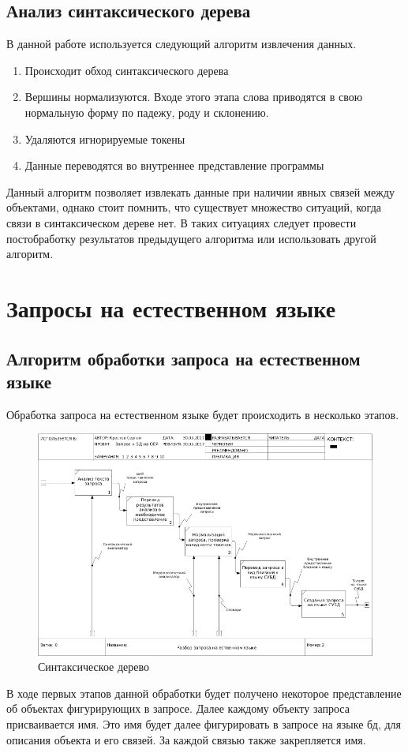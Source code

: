 \subsection{Анализ синтаксического дерева}
В данной работе используется следующий алгоритм извлечения данных. 
\begin{enumerate}
\item Происходит обход синтаксического дерева
\item Вершины нормализуются. Входе этого этапа слова приводятся в свою нормальную форму по падежу, роду и склонению.
\item Удаляются игнорируемые токены
\item Данные переводятся во внутреннее представление программы
\end{enumerate}
Данный алгоритм позволяет извлекать данные при наличии явных связей между объектами, однако стоит помнить, что существует множество ситуаций, когда связи в синтаксическом дереве нет. В таких ситуациях следует провести постобработку результатов предыдущего алгоритма или использовать другой алгоритм.
\section{Запросы на естественном языке}
\subsection{Алгоритм обработки запроса на естественном языке}
Обработка запроса на естественном языке будет происходить в несколько этапов. 
\begin{figure}[!h]
  \centering
  \includegraphics[scale = 0.5]{./first_dia/02_0.png}
  \caption{Синтаксическое дерево}
  \label{fig:fig04}
\end{figure}
В ходе первых этапов данной обработки будет получено некоторое представление об объектах фигурирующих в запросе.  Далее каждому объекту запроса присваивается имя. Это имя будет далее фигурировать в запросе на языке бд, для описания объекта и его связей. За каждой связью также закрепляется имя.
